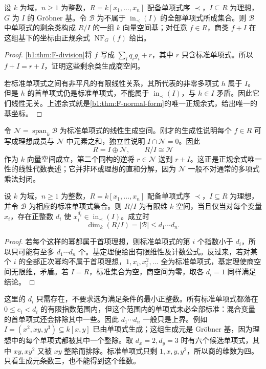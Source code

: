 \begin{theorem}[标准单项式基]\label{b1:thm:F-standard-monomial-basis}
	设 \(k\) 为域，\(n\geq1\) 为整数，\(R=k[x_1,\ldots,x_n]\) 配备单项式序 \(\prec\)，\(I\subseteq R\) 为理想，\(G\) 为 \(I\) 的 Gröbner 基。令 \(\mathcal B\) 为不属于 \(\operatorname{in}_{\prec}(I)\) 的全部单项式所成集合。则 \(\mathcal B\) 中单项式的剩余类构成 \(R/I\) 的一组 \(k\) 向量空间基；对任意 \(f\in R\)，商类 \(f+I\) 在这组基下的坐标由正规余式 \(\operatorname{NF}_G(f)\) 给出。
\end{theorem}
\begin{proof}
	\cref{b1:thm:F-division}将 \(f\) 写成 \(\sum_iq_ig_i+r\)，其中 \(r\) 只含标准单项式。所以 \(f+I=r+I\)，证明这些剩余类生成商空间。

	若标准单项式之间有非平凡的有限线性关系，其所代表的非零多项式 \(h\) 属于 \(I\)。但是 \(h\) 的首单项式仍是标准单项式，不能属于 \(\operatorname{in}_{\prec}(I)\)，与 \(h\in I\) 矛盾。因此它们线性无关。上述余式就是\cref{b1:thm:F-normal-form}的唯一正规余式，给出唯一的基坐标。
\end{proof}

令 \(\mathcal N=\operatorname{span}_k\mathcal B\) 为标准单项式的线性生成空间。刚才的生成性说明每个 \(f\in R\) 可写成理想成员与 \(\mathcal N\) 中元素之和，独立性说明 \(I\cap\mathcal N=0\)。因此
\[
	R=I\oplus\mathcal N,\qquad R/I\cong\mathcal N
\]
作为 \(k\) 向量空间成立，第二个同构的逆将 \(r\in\mathcal N\) 送到 \(r+I\)。这正是正规余式唯一性的线性代数表述；它并非环或理想的直和分解，因为 \(\mathcal N\) 一般不对通常的多项式乘法封闭。

\begin{corollary}\label{b1:cor:F-finite-quotient}
	设 \(k\) 为域，\(n\geq1\) 为整数，\(R=k[x_1,\ldots,x_n]\) 配备单项式序 \(\prec\)，\(I\subseteq R\) 为理想，并令 \(\mathcal B\) 为相应的标准单项式集合。则 \(R/I\) 为有限维 \(k\) 空间，当且仅当对每个变量 \(x_i\)，存在正整数 \(d_i\) 使 \(x_i^{d_i}\in\operatorname{in}_{\prec}(I)\)。成立时
	\[
		\dim_k(R/I)=|\mathcal B|\le d_1\cdots d_n.
	\]
\end{corollary}
\begin{proof}
	若每个这样的幂都属于首项理想，则标准单项式的第 \(i\) 个指数小于 \(d_i\)，所以只可能有至多 \(d_1\cdots d_n\) 个。基定理便给出有限维性及计数公式。反过来，若对某个 \(i\) 的全部正次幂均不属于首项理想，\(1,x_i,x_i^2,\ldots\) 全为标准单项式，基定理使商空间无限维，矛盾。若 \(I=R\)，标准集合为空，商空间为零，取各 \(d_i=1\) 同样满足结论。
\end{proof}

这里的 \(d_i\) 只需存在，不要求选为满足条件的最小正整数。所有标准单项式都落在 \(0\le e_i<d_i\) 的有限指数范围内，但这个范围内的单项式未必全部标准：混合变量的首单项式还会排除其中一些。因此 \(d_1\cdots d_n\) 一般只是上界。例如 \(I=(x^2,xy,y^3)\subseteq k[x,y]\) 已由单项式生成；这组生成元是 Gröbner 基，因为理想中的每个单项式都被其中一个整除。取 \(d_x=2,d_y=3\) 时有六个候选单项式，其中 \(xy,xy^2\) 又被 \(xy\) 整除而排除。标准单项式只剩 \(1,x,y,y^2\)，所以商的维数为四。只看生成元条数三，也不能得到这个维数。

